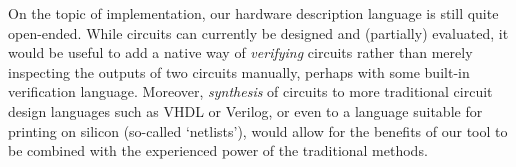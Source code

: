 On the topic of implementation, our hardware description language is still
quite open-ended.
While circuits can currently be designed and (partially) evaluated, it would be
useful to add a native way of \emph{verifying} circuits rather than merely
inspecting the outputs of two circuits manually, perhaps with some built-in
verification language.
Moreover, \emph{synthesis} of circuits to more traditional circuit design
languages such as VHDL or Verilog, or even to a language suitable for printing
on silicon (so-called `netlists'), would allow for the benefits of our tool to
be combined with the experienced power of the traditional methods.